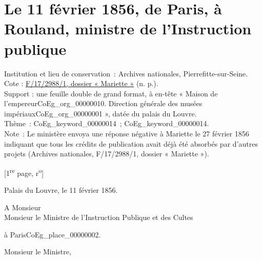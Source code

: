 \documentclass{book}
\begin{document}
\hypertarget{CoEg_Mariette_1856-02-11}{}

\section*{Le 11 février 1856, de Paris, à Rouland, ministre de l’Instruction publique}
 \label{labCoEg_Mariette_1856-02-11}
{\footnotesize
\noindent Institution et lieu de conservation~: Archives nationales, Pierrefitte-sur-Seine.\\
Cote : \hyperlink{CoEg_Mariette_ms_002}{F/17/2988/1, dossier « Mariette »} (n. p.).\\
Support : une feuille double de grand format, à en-tête « Maison de l’empereur\gls{CoEg_org_00000010}. Direction générale des musées impériaux\gls{CoEg_org_00000001} », datée du palais du Louvre.\\
Thème~: \gls{CoEg_keyword_00000014}~; \gls{CoEg_keyword_00000014}.\\
Note~: Le ministère envoya une réponse négative à Mariette le 27 février 1856 indiquant que tous les crédits de publication avait déjà été absorbés par d’autres projets (Archives nationales, F/17/2988/1, dossier « Mariette »).}

{\footnotesize\begin{center} {[1\textsuperscript{re} page, r\textsuperscript{o}]}\end{center}}
\begin{flushright}Palais du Louvre, le 11 février 1856.\end{flushright}
\indent A Monsieur\\
\indent Monsieur le Ministre de l’Instruction Publique et des Cultes
\begin{center}à Paris\gls{CoEg_place_00000002}.\end{center}

\hspace{1cm}Monsieur le Ministre,\\
\end{document}
